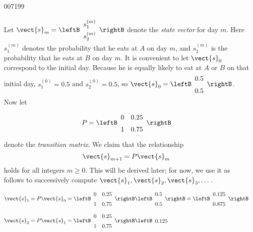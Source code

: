\begin{example}{}{007199}
\begin{solution}
\hspace*{0.5em} Let $\vect{s}_{m} = \leftB \def\arraystretch{1.5}\begin{array}{c}
s_{1}^{(m)} \\
s_{2}^{(m)}
\end{array} \rightB$
 denote the \textit{state vector} for day $m$. Here $s_{1}^{(m)}$ denotes the probability that he eats at $A$ on day $m$, and $s_{2}^{(m)}$ is the probability that he eats at $B$ on day $m$. It is convenient to let $\vect{s}_{0}$ correspond to the initial day. Because he is equally likely to eat at $A$ or $B$ on that initial day, $s_{1}^{(0)} = 0.5$ and $s_{2}^{(0)} = 0.5$, so $\vect{s}_{0} = \leftB \begin{array}{c}
0.5 \\
0.5
 \end{array} \rightB$.
 Now let
\begin{equation*}
P = \leftB \begin{array}{rr}
0 & 0.25 \\
1 & 0.75
\end{array} \rightB
\end{equation*}
denote the \textit{transition matrix}. We claim that the relationship
\begin{equation*}
\vect{s}_{m+1} = P\vect{s}_m
\end{equation*}
holds for all integers $m \geq 0$. This will be derived later; for now, we use it as follows to successively compute $\vect{s}_{1}, \vect{s}_{2}, \vect{s}_{3}, \dots$.
\begin{align*}
\vect{s}_{1} &= P\vect{s}_0 = \leftB \begin{array}{rr}
0 & 0.25 \\
1 & 0.75
\end{array} \rightB \leftB \begin{array}{r}
0.5 \\
0.5 
\end{array} \rightB = \leftB \begin{array}{r}
0.125 \\
0.875
\end{array} \rightB \\
\vect{s}_{2} &= P\vect{s}_1 = \leftB \begin{array}{rr}
0 & 0.25 \\
1 & 0.75
\end{array} \rightB \leftB \begin{array}{r}
0.125 \\

\end{array}
\end{align*}
\end{solution}
\end{example}
